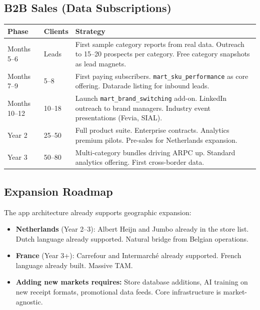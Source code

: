 \documentclass[11pt,a4paper]{article}
\begin{document}
\subsection{B2B Sales (Data Subscriptions)}

\begin{center}
\renewcommand{\arraystretch}{1.3}
\begin{tabularx}{\textwidth}{C{2cm} C{2cm} L{9cm}}
\toprule
{}
\textbf{\color{white}Phase} & \textbf{\color{white}Clients} & \textbf{\color{white}Strategy} \\
\midrule
Months 5--6 & Leads & First sample category reports from real data. Outreach to 15--20 prospects per category. Free category snapshots as lead magnets. \\
Months 7--9 & 5--8 & First paying subscribers. \texttt{mart\_sku\_performance} as core offering. Datarade listing for inbound leads. \\
Months 10--12 & 10--18 & Launch \texttt{mart\_brand\_switching} add-on. LinkedIn outreach to brand managers. Industry event presentations (Fevia, SIAL). \\
Year 2 & 25--50 & Full product suite. Enterprise contracts. Analytics premium pilots. Pre-sales for Netherlands expansion. \\
Year 3 & 50--80 & Multi-category bundles driving ARPC up. Standard analytics offering. First cross-border data. \\
\bottomrule
\end{tabularx}
\end{center}

\subsection{Expansion Roadmap}

The app architecture already supports geographic expansion:

\begin{itemize}[leftmargin=1.5em, itemsep=3pt]
  \item \textbf{Netherlands} (Year 2--3): Albert Heijn and Jumbo already in the store list. Dutch language already supported. Natural bridge from Belgian operations.
  \item \textbf{France} (Year 3+): Carrefour and Intermarch\'{e} already supported. French language already built. Massive TAM.
  \item \textbf{Adding new markets requires:} Store database additions, AI training on new receipt formats, promotional data feeds. Core infrastructure is market-agnostic.
\end{itemize}
\end{document}
